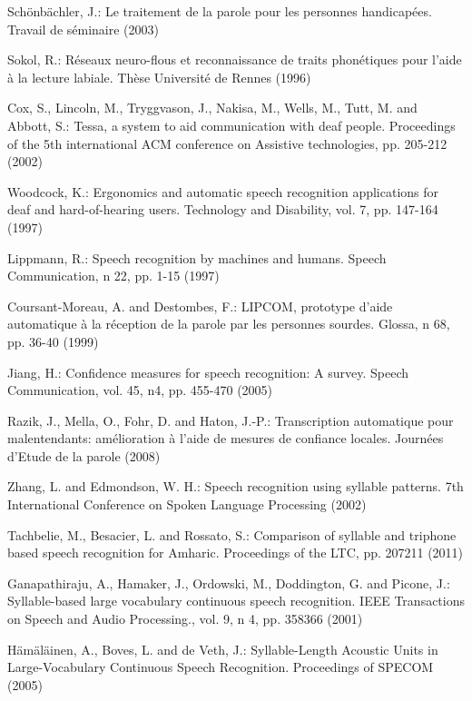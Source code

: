 \documentclass[runningheads,a4paper]{llncs}
\begin{document}
\begin{thebibliography}{1}

 Schönbächler, J.: Le traitement de la parole pour les personnes handicapées. Travail de séminaire (2003)

 Sokol, R.: Réseaux neuro-flous et reconnaissance de traits phonétiques pour l'aide à la lecture labiale. Thèse Université de Rennes (1996)

Cox, S., Lincoln, M., Tryggvason, J., Nakisa, M., Wells, M., Tutt, M. and Abbott, S.: Tessa, a system to aid communication with deaf people. Proceedings of the 5th international ACM conference on Assistive technologies, pp. 205-212 (2002)

 Woodcock, K.: Ergonomics and automatic speech recognition applications for deaf and hard-of-hearing users. Technology and Disability, vol. 7, pp. 147-164 (1997)

Lippmann, R.: Speech recognition by machines and humans. Speech Communication, n\textdegree{} 22, pp. 1-15 (1997)

Coursant-Moreau, A. and Destombes, F.: LIPCOM, prototype d'aide automatique à la réception de la parole par les personnes sourdes. Glossa, n\textdegree{} 68, pp. 36-40 (1999)

Jiang, H.: Confidence measures for speech recognition: A survey. Speech Communication, vol. 45, n\textdegree{}4, pp. 455-470 (2005)

Razik, J., Mella, O., Fohr, D. and Haton, J.-P.: Transcription automatique pour malentendants: amélioration à l'aide de mesures de confiance locales. Journées d'Etude de la parole (2008)

Zhang, L. and Edmondson, W. H.: Speech recognition using syllable patterns. 7th International Conference on Spoken Language Processing (2002)

Tachbelie, M., Besacier, L. and Rossato, S.: Comparison of syllable and triphone based speech recognition for Amharic. Proceedings of the LTC, pp. 207\textendash{}211 (2011)

 Ganapathiraju, A., Hamaker, J., Ordowski, M., Doddington, G. and Picone, J.: Syllable-based large vocabulary continuous speech recognition. IEEE Transactions on Speech and Audio Processing., vol. 9, n\textdegree{} 4, pp. 358\textendash{}366 (2001)

 Hämäläinen, A., Boves, L. and de Veth, J.: Syllable-Length Acoustic Units in Large-Vocabulary Continuous Speech Recognition. Proceedings of SPECOM (2005)


\end{thebibliography}
\end{document}
